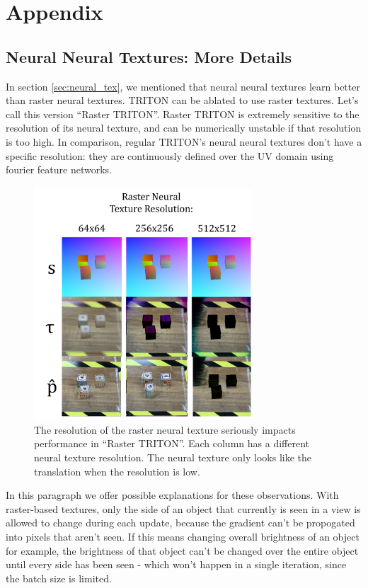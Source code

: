 \section{Appendix} 

\subsection{Neural Neural Textures: More Details}

	In section \ref{sec:neural_tex}, we mentioned that neural neural textures learn better than raster neural textures. 
	TRITON can be ablated to use raster textures. Let's call this version ``Raster TRITON''. 
	Raster TRITON is extremely sensitive to the resolution of its neural texture, and can be numerically unstable if that resolution is too high.
	In comparison, regular TRITON's neural neural textures don't have a specific resolution: they are continuously defined over the UV domain using fourier feature networks.

	\begin{figure}[H]
		\begin{center}
			\includegraphics[width=230pt]{../images/raster_texture_resolution_comparisons.pdf}
		\end{center}
		\caption{
			The resolution of the raster neural texture seriously impacts performance in ``Raster TRITON''. Each column has a different neural texture resolution.
			The neural texture only looks like the translation when the resolution is low.
		}
		\label{fig:raster_texture_resolution_comparisons}
	\end{figure}

	In this paragraph we offer possible explanations for these observations.
	With raster-based textures, only the side of an object that currently is seen in a view is allowed to change during each update, because the gradient can't be propogated into pixels that aren't seen.
	If this means changing overall brightness of an object for example, the brightness of that object can't be changed over the entire object until every side has been seen - which won't happen in a single iteration, since the batch size is limited.

